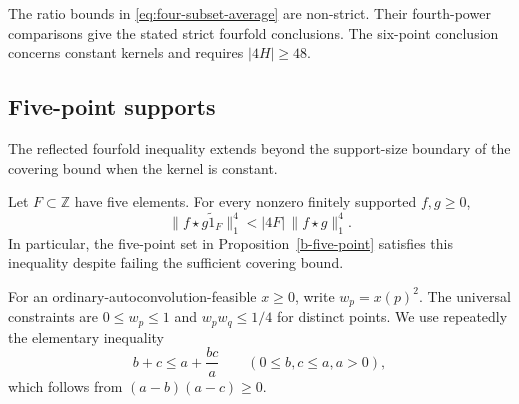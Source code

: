 The ratio bounds in \eqref{eq:four-subset-average} are non-strict.
Their fourth-power comparisons give the stated strict fourfold
conclusions. The six-point conclusion concerns constant kernels and
requires $|4H|\ge48$.




\subsection{Five-point supports}

The reflected fourfold inequality extends beyond the support-size
boundary of the covering bound when the kernel is constant.

\begin{theorem}\label{thm:five-point}
Let $F\subset\mathbb Z$ have five elements. For every nonzero finitely
supported $f,g\ge0$,
\[
 \|f\star\widetilde{g1_F}\|_1^4
 < |4F|\,\|f\star g\|_1^4.
\]
In particular, the five-point set in Proposition~\ref{b-five-point}
satisfies this inequality despite failing the sufficient covering bound.
\end{theorem}

For an ordinary-autoconvolution-feasible $x\ge0$, write $w_p=x(p)^2$.
The universal constraints are $0\le w_p\le1$ and
$w_pw_q\le1/4$ for distinct points. We use repeatedly the elementary
inequality
\begin{equation}\label{five-box}
 b+c\le a+\frac{bc}{a}\qquad(0\le b,c\le a, a>0),
\end{equation}
which follows from $(a-b)(a-c)\ge0$.

